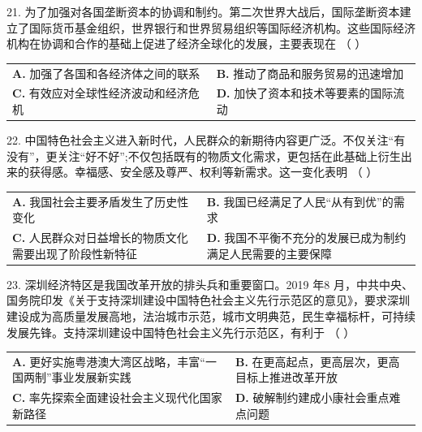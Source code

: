 \documentclass[UTF8,11pt]{ctexart}
\begin{document}
21. 为了加强对各国垄断资本的协调和制约。第二次世界大战后，国际垄断资本建立了国际货币基金组织，世界银行和世界贸易组织等国际经济机构。这些国际经济机构在协调和合作的基础上促进了经济全球化的发展，主要表现在 （    ）


\begin{center}\begin{tabular}{>{\raggedright\arraybackslash}p{\dimexpr(\linewidth-4\tabcolsep)/2\relax}>{\raggedright\arraybackslash}p{\dimexpr(\linewidth-4\tabcolsep)/2\relax}}
\textbf{A.} 加强了各国和各经济体之间的联系 & \textbf{B.} 推动了商品和服务贸易的迅速增加\\[.35em]
\textbf{C.} 有效应对全球性经济波动和经济危机 & \textbf{D.} 加快了资本和技术等要素的国际流动\\[.35em]\end{tabular}\end{center}

22. 中国特色社会主义进入新时代，人民群众的新期待内容更广泛。不仅关注“有没有”，更关注“好不好”;不仅包括既有的物质文化需求，更包括在此基础上衍生出来的获得感。幸福感、安全感及尊严、权利等新需求。这一变化表明 （    ）


\begin{center}\begin{tabular}{>{\raggedright\arraybackslash}p{\dimexpr(\linewidth-4\tabcolsep)/2\relax}>{\raggedright\arraybackslash}p{\dimexpr(\linewidth-4\tabcolsep)/2\relax}}
\textbf{A.} 我国社会主要矛盾发生了历史性变化 & \textbf{B.} 我国已经满足了人民“从有到优”的需求\\[.35em]
\textbf{C.} 人民群众对日益增长的物质文化需要出现了阶段性新特征 & \textbf{D.} 我国不平衡不充分的发展已成为制约满足人民需要的主要保障\\[.35em]\end{tabular}\end{center}

23. 深圳经济特区是我国改革开放的排头兵和重要窗口。2019 年8 月，中共中央、国务院印发《关于支持深圳建设中国特色社会主义先行示范区的意见》，要求深圳建设成为高质量发展高地，法治城市示范，城市文明典范，民生幸福标杆，可持续发展先锋。支持深圳建设中国特色社会主义先行示范区，有利于 （    ）


\begin{center}\begin{tabular}{>{\raggedright\arraybackslash}p{\dimexpr(\linewidth-4\tabcolsep)/2\relax}>{\raggedright\arraybackslash}p{\dimexpr(\linewidth-4\tabcolsep)/2\relax}}
\textbf{A.} 更好实施粤港澳大湾区战略，丰富“一国两制”事业发展新实践 & \textbf{B.} 在更高起点，更高层次，更高目标上推进改革开放\\[.35em]
\textbf{C.} 率先探索全面建设社会主义现代化国家新路径 & \textbf{D.} 破解制约建成小康社会重点难点问题\\[.35em]\end{tabular}\end{center}
\end{document}
